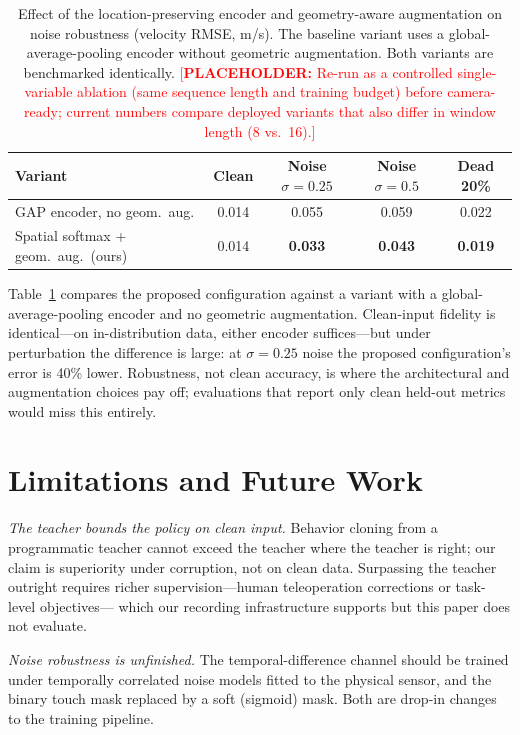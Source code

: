 \documentclass[runningheads]{llncs}
\newcommand{\placeholder}[1]{\textcolor{red}{[\textbf{PLACEHOLDER:} #1]}}
\begin{document}
\begin{table}[t]
\centering
\caption{Effect of the location-preserving encoder and geometry-aware
augmentation on noise robustness (velocity RMSE, m/s). The baseline
variant uses a global-average-pooling encoder without geometric
augmentation. Both variants are benchmarked identically.
\placeholder{Re-run as a controlled single-variable ablation (same
sequence length and training budget) before camera-ready; current numbers
compare deployed variants that also differ in window length (8 vs.\ 16).}}
\label{tab:ablation}
\begin{tabular}{lcccc}
\toprule
Variant & Clean & Noise $\sigma{=}0.25$ & Noise $\sigma{=}0.5$ & Dead 20\% \\
\midrule
GAP encoder, no geom.\ aug. & 0.014 & 0.055 & 0.059 & 0.022 \\
Spatial softmax + geom.\ aug.\ (ours) & 0.014 & \textbf{0.033} & \textbf{0.043} & \textbf{0.019} \\
\bottomrule
\end{tabular}
\end{table}

Table~\ref{tab:ablation} compares the proposed configuration against a
variant with a global-average-pooling encoder and no geometric
augmentation.  Clean-input fidelity is identical---on in-distribution
data, either encoder suffices---but under perturbation the difference is
large: at $\sigma{=}0.25$ noise the proposed configuration's error is 40\%
lower.  Robustness, not clean accuracy, is where the architectural and
augmentation choices pay off; evaluations that report only clean held-out
metrics would miss this entirely.

\section{Limitations and Future Work}
\label{sec:limitations}

\emph{The teacher bounds the policy on clean input.}
Behavior cloning from a programmatic teacher cannot exceed the teacher
where the teacher is right; our claim is superiority under corruption, not
on clean data.  Surpassing the teacher outright requires richer
supervision---human teleoperation corrections or task-level objectives---
which our recording infrastructure supports but this paper does not
evaluate.

\emph{Noise robustness is unfinished.}
The temporal-difference channel should be trained under temporally
correlated noise models fitted to the physical sensor, and the binary
touch mask replaced by a soft (sigmoid) mask.  Both are drop-in changes to
the training pipeline.
\end{document}
